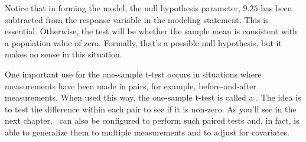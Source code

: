 Notice that in forming the model, 
the null hypothesis parameter, $9.25$ has been subtracted
from the response variable in the modeling statement.  This is
essential.  Otherwise, the test will be whether the sample mean is
consistent with a population value of zero.  Formally, that's a
possible null hypothesis, but it makes no sense in this situation.

One important use for the one-sample t-test occurs in situations where 
measurements have been made in pairs, for example, before-and-after
measurements.  When used this way, the one-sample t-test is called a
.  The idea is to test the difference within
each pair to see if it is non-zero.  As you'll see in the next
chapter, \ANOVA\ can also be configured to perform such paired tests
and, in fact, is able to generalize them to multiple measurements and
to adjust for covariates.


